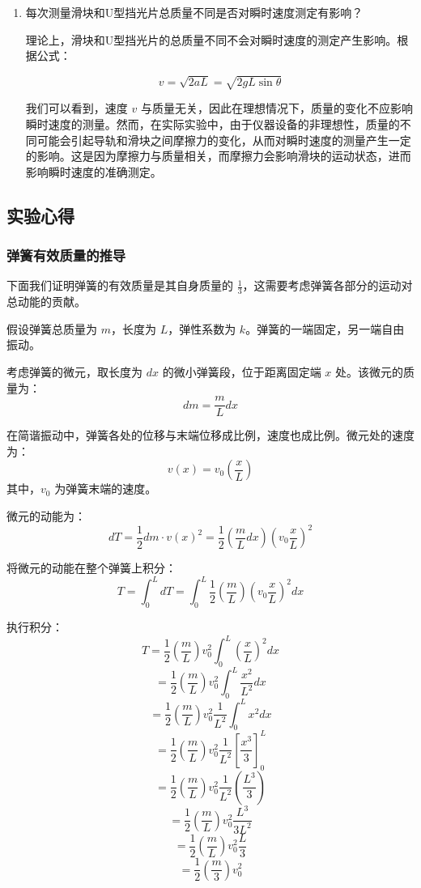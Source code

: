 \documentclass[zihao=5, UTF8]{article}
\theoremstyle{MyLineTheoremStyle} %
\theoremstyle{MyBlockTheoremStyle} %
\theoremstyle{MySubsubsectionStyle} %
\begin{document}
\begin{enumerate}
    \item 每次测量滑块和U型挡光片总质量不同是否对瞬时速度测定有影响？
    
理论上，滑块和U型挡光片的总质量不同不会对瞬时速度的测定产生影响。根据公式：

\[
v = \sqrt{2aL} = \sqrt{2gL \sin \theta}
\]

我们可以看到，速度 \(v\) 与质量无关，因此在理想情况下，质量的变化不应影响瞬时速度的测量。然而，在实际实验中，由于仪器设备的非理想性，质量的不同可能会引起导轨和滑块之间摩擦力的变化，从而对瞬时速度的测量产生一定的影响。这是因为摩擦力与质量相关，而摩擦力会影响滑块的运动状态，进而影响瞬时速度的准确测定。

\end{enumerate}

\subsection{实验心得}

\subsubsection{弹簧有效质量的推导}

下面我们证明弹簧的有效质量是其自身质量的 $\frac{1}{3}$，这需要考虑弹簧各部分的运动对总动能的贡献。

假设弹簧总质量为 $ m $，长度为 $ L $，弹性系数为 $ k $。弹簧的一端固定，另一端自由振动。

考虑弹簧的微元，取长度为 $ dx $ 的微小弹簧段，位于距离固定端 $ x $ 处。该微元的质量为：
$$
dm = \frac{m}{L} dx
$$

在简谐振动中，弹簧各处的位移与末端位移成比例，速度也成比例。微元处的速度为：
$$
v(x) = v_0 \left( \frac{x}{L} \right)
$$
其中，$ v_0 $ 为弹簧末端的速度。

微元的动能为：
$$
dT = \frac{1}{2} dm \cdot v(x)^2 = \frac{1}{2} \left( \frac{m}{L} dx \right) \left( v_0 \frac{x}{L} \right)^2
$$

将微元的动能在整个弹簧上积分：
$$
T = \int_0^L dT = \int_0^L \frac{1}{2} \left( \frac{m}{L} \right) \left( v_0 \frac{x}{L} \right)^2 dx
$$

执行积分：
$$
T = \frac{1}{2} \left( \frac{m}{L} \right) v_0^2 \int_0^L \left( \frac{x}{L} \right)^2 dx
$$
$$
= \frac{1}{2} \left( \frac{m}{L} \right) v_0^2 \int_0^L \frac{x^2}{L^2} dx
$$
$$
= \frac{1}{2} \left( \frac{m}{L} \right) v_0^2 \frac{1}{L^2} \int_0^L x^2 dx
$$
$$
= \frac{1}{2} \left( \frac{m}{L} \right) v_0^2 \frac{1}{L^2} \left[ \frac{x^3}{3} \right]_0^L
$$
$$
= \frac{1}{2} \left( \frac{m}{L} \right) v_0^2 \frac{1}{L^2} \left( \frac{L^3}{3} \right)
$$
$$
= \frac{1}{2} \left( \frac{m}{L} \right) v_0^2 \frac{L^3}{3L^2}
$$
$$
= \frac{1}{2} \left( \frac{m}{L} \right) v_0^2 \frac{L}{3}
$$
$$
= \frac{1}{2} \left( \frac{m}{3} \right) v_0^2
$$
\end{document}
